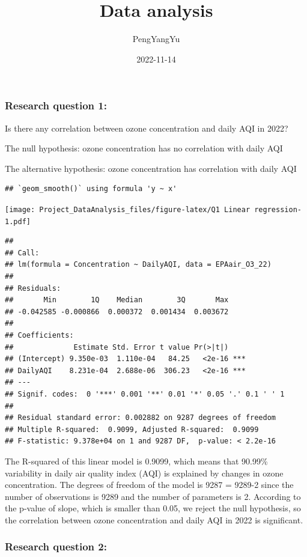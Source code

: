 \documentclass[
  12pt,
]{article}
\title{Data analysis}
\author{PengYangYu}
\date{2022-11-14}
\begin{document}
\maketitle

\hypertarget{research-question-1}{%
\subsubsection{Research question 1:}\label{research-question-1}}

Is there any correlation between ozone concentration and daily AQI in
2022?

The null hypothesis: ozone concentration has no correlation with daily
AQI

The alternative hypothesis: ozone concentration has correlation with
daily AQI

\begin{verbatim}
## `geom_smooth()` using formula 'y ~ x'
\end{verbatim}

\texttt{[image: Project\_DataAnalysis\_files/figure-latex/Q1 Linear regression-1.pdf]}

\begin{verbatim}
## 
## Call:
## lm(formula = Concentration ~ DailyAQI, data = EPAair_O3_22)
## 
## Residuals:
##       Min        1Q    Median        3Q       Max 
## -0.042585 -0.000866  0.000372  0.001434  0.003672 
## 
## Coefficients:
##              Estimate Std. Error t value Pr(>|t|)    
## (Intercept) 9.350e-03  1.110e-04   84.25   <2e-16 ***
## DailyAQI    8.231e-04  2.688e-06  306.23   <2e-16 ***
## ---
## Signif. codes:  0 '***' 0.001 '**' 0.01 '*' 0.05 '.' 0.1 ' ' 1
## 
## Residual standard error: 0.002882 on 9287 degrees of freedom
## Multiple R-squared:  0.9099, Adjusted R-squared:  0.9099 
## F-statistic: 9.378e+04 on 1 and 9287 DF,  p-value: < 2.2e-16
\end{verbatim}

The R-squared of this linear model is 0.9099, which means that 90.99\%
variability in daily air quality index (AQI) is explained by changes in
ozone concentration. The degrees of freedom of the model is 9287 =
9289-2 since the number of observations is 9289 and the number of
parameters is 2. According to the p-value of slope, which is smaller
than 0.05, we reject the null hypothesis, so the correlation between
ozone concentration and daily AQI in 2022 is significant.

\hypertarget{research-question-2}{%
\subsubsection{Research question 2:}\label{research-question-2}}
\end{document}
